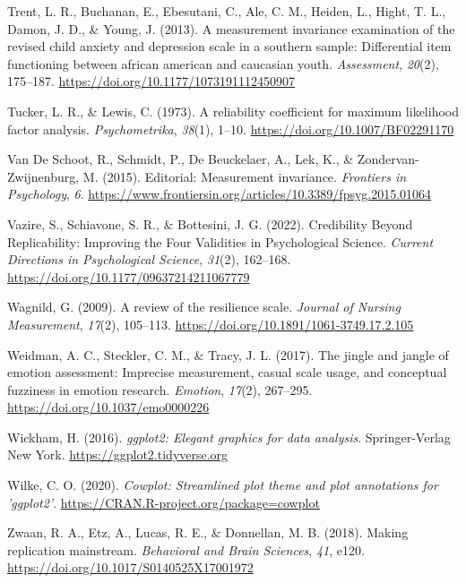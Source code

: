 \documentclass[
  man]{apa7}
\newlength{\cslhangindent}
\newlength{\cslentryspacingunit} %
\newenvironment{CSLReferences}[2] %
 {%
  \setlength{\parindent}{0pt}
  \ifodd #1
  \let\oldpar\par
  \def\par{\hangindent=\cslhangindent\oldpar}
  \fi
  \setlength{\parskip}{#2\cslentryspacingunit}
 }%
 {}
\begin{document}
\begin{CSLReferences}{1}{0}
\leavevmode{}%
Trent, L. R., Buchanan, E., Ebesutani, C., Ale, C. M., Heiden, L., Hight, T. L., Damon, J. D., \& Young, J. (2013). A measurement invariance examination of the revised child anxiety and depression scale in a southern sample: Differential item functioning between african american and caucasian youth. \emph{Assessment}, \emph{20}(2), 175--187. \url{https://doi.org/10.1177/1073191112450907}

\leavevmode{}%
Tucker, L. R., \& Lewis, C. (1973). A reliability coefficient for maximum likelihood factor analysis. \emph{Psychometrika}, \emph{38}(1), 1--10. \url{https://doi.org/10.1007/BF02291170}

\leavevmode{}%
Van De Schoot, R., Schmidt, P., De Beuckelaer, A., Lek, K., \& Zondervan-Zwijnenburg, M. (2015). Editorial: Measurement invariance. \emph{Frontiers in Psychology}, \emph{6}. \url{https://www.frontiersin.org/articles/10.3389/fpsyg.2015.01064}

\leavevmode{}%
Vazire, S., Schiavone, S. R., \& Bottesini, J. G. (2022). Credibility Beyond Replicability: Improving the Four Validities in Psychological Science. \emph{Current Directions in Psychological Science}, \emph{31}(2), 162--168. \url{https://doi.org/10.1177/09637214211067779}

\leavevmode{}%
Wagnild, G. (2009). A review of the resilience scale. \emph{Journal of Nursing Measurement}, \emph{17}(2), 105--113. \url{https://doi.org/10.1891/1061-3749.17.2.105}

\leavevmode{}%
Weidman, A. C., Steckler, C. M., \& Tracy, J. L. (2017). The jingle and jangle of emotion assessment: Imprecise measurement, casual scale usage, and conceptual fuzziness in emotion research. \emph{Emotion}, \emph{17}(2), 267--295. \url{https://doi.org/10.1037/emo0000226}

\leavevmode{}%
Wickham, H. (2016). \emph{ggplot2: Elegant graphics for data analysis}. Springer-Verlag New York. \url{https://ggplot2.tidyverse.org}

\leavevmode{}%
Wilke, C. O. (2020). \emph{Cowplot: Streamlined plot theme and plot annotations for 'ggplot2'}. \url{https://CRAN.R-project.org/package=cowplot}

\leavevmode{}%
Zwaan, R. A., Etz, A., Lucas, R. E., \& Donnellan, M. B. (2018). Making replication mainstream. \emph{Behavioral and Brain Sciences}, \emph{41}, e120. \url{https://doi.org/10.1017/S0140525X17001972}

\end{CSLReferences}
\end{document}

